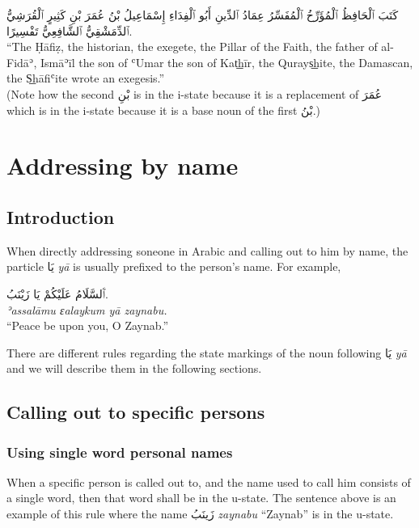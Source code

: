 \documentclass[
  10pt,
]{book}
\begin{document}
\foreignlanguage{arabic}{کَتَبَ ٱلْحَافِظُ ٱلْمُؤَرِّخُ ٱلْمُفَسِّرُ عِمَادُ ٱلدِّينِ أَبُو ٱلْفِدَاءِ إِسْمَاعِيلُ بْنُ عُمَرَ بْنِ کَثِيرٍ ٱلْقُرَشِيُّ ٱلدِّمَشْقِيُّ ٱلشَّافِعِيُّ تَفْسِيرًا.}\\
\enquote{The Ḥāfiẓ, the historian, the exegete, the Pillar of the Faith, the father of al-Fidāʾ, Ismāʾīl the son of ʿUmar the son of Kat͟hīr, the Qurays͟hite, the Damascan, the S͟hāfiʿite wrote an exegesis.}\\
(Note how the second \foreignlanguage{arabic}{بْنِ} is in the i-state because it is a replacement of \foreignlanguage{arabic}{عُمَرَ} which is in the i-state because it is a base noun of the first \foreignlanguage{arabic}{بْنُ}.)

\chapter{Addressing by name}\label{addressing-by-name}

\section{Introduction}\label{introduction-13}

When directly addressing soneone in Arabic and calling out to him by name, the particle \foreignlanguage{arabic}{يَا} \emph{yā} is usually prefixed to the person's name. For example,

\foreignlanguage{arabic}{ٱَلسَّلَامُ عَلَيْکُمْ يَا زَيْنَبُ.}\\
\emph{ʾassalāmu ɛalaykum yā zaynabu.}\\
\enquote{Peace be upon you, O Zaynab.}

There are different rules regarding the state markings of the noun following \foreignlanguage{arabic}{يَا} \emph{yā} and we will describe them in the following sections.

\section{Calling out to specific persons}\label{calling-out-to-specific-persons}

\subsection{Using single word personal names}\label{using-single-word-personal-names}

When a specific person is called out to, and the name used to call him consists of a single word, then that word shall be in the u-state. The sentence above is an example of this rule where the name \foreignlanguage{arabic}{زَينَبُ} \emph{zaynabu} \enquote{Zaynab} is in the u-state.
\end{document}

